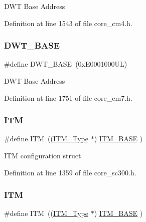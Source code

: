 D\+WT Base Address 

Definition at line 1543 of file core\+\_\+cm4.\+h.

\mbox{\label{group___c_m_s_i_s__core__base_gafdab534f961bf8935eb456cb7700dcd2}} 
\subsubsection{\texorpdfstring{D\+W\+T\+\_\+\+B\+A\+SE}{DWT\_BASE}\hspace{0.1cm}{\footnotesize\ttfamily [4/4]}}
{\footnotesize\ttfamily \#define D\+W\+T\+\_\+\+B\+A\+SE~(0x\+E0001000\+U\+L)}

D\+WT Base Address 

Definition at line 1751 of file core\+\_\+cm7.\+h.

\mbox{\label{group___c_m_s_i_s__core__base_gabae7cdf882def602cb787bb039ff6a43}} 
\subsubsection{\texorpdfstring{I\+TM}{ITM}\hspace{0.1cm}{\footnotesize\ttfamily [1/4]}}
{\footnotesize\ttfamily \#define I\+TM~((\hyperlink{struct_i_t_m___type}{I\+T\+M\+\_\+\+Type}       $\ast$)     \hyperlink{group___c_m_s_i_s__core__base_gadd76251e412a195ec0a8f47227a8359e}{I\+T\+M\+\_\+\+B\+A\+SE}      )}

I\+TM configuration struct 

Definition at line 1359 of file core\+\_\+sc300.\+h.

\mbox{\label{group___c_m_s_i_s__core__base_gabae7cdf882def602cb787bb039ff6a43}} 
\subsubsection{\texorpdfstring{I\+TM}{ITM}\hspace{0.1cm}{\footnotesize\ttfamily [2/4]}}
{\footnotesize\ttfamily \#define I\+TM~((\hyperlink{struct_i_t_m___type}{I\+T\+M\+\_\+\+Type}       $\ast$)     \hyperlink{group___c_m_s_i_s__core__base_gadd76251e412a195ec0a8f47227a8359e}{I\+T\+M\+\_\+\+B\+A\+SE}      )}

